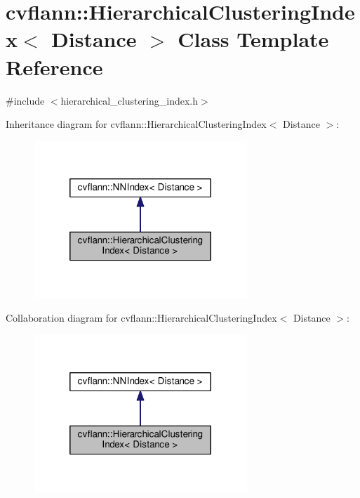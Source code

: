 \hypertarget{classcvflann_1_1HierarchicalClusteringIndex}{\section{cvflann\-:\-:Hierarchical\-Clustering\-Index$<$ Distance $>$ Class Template Reference}
\label{classcvflann_1_1HierarchicalClusteringIndex}
}


{\ttfamily \#include $<$hierarchical\-\_\-clustering\-\_\-index.\-h$>$}



Inheritance diagram for cvflann\-:\-:Hierarchical\-Clustering\-Index$<$ Distance $>$\-:\nopagebreak
\begin{figure}[H]
\begin{center}
\leavevmode
\includegraphics[width=228pt]{classcvflann_1_1HierarchicalClusteringIndex__inherit__graph}
\end{center}
\end{figure}


Collaboration diagram for cvflann\-:\-:Hierarchical\-Clustering\-Index$<$ Distance $>$\-:\nopagebreak
\begin{figure}[H]
\begin{center}
\leavevmode
\includegraphics[width=228pt]{classcvflann_1_1HierarchicalClusteringIndex__coll__graph}
\end{center}
\end{figure}
